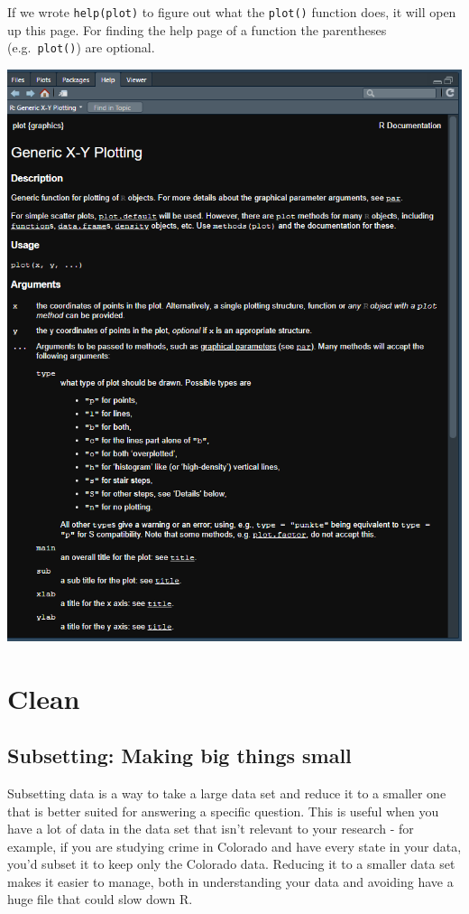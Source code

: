 \documentclass[
  12pt,
  openany]{book}
\begin{document}
If we wrote \texttt{help(plot)} to figure out what the \texttt{plot()} function does, it will open up this page. For finding the help page of a function the parentheses (e.g.~\texttt{plot()}) are optional.

\includegraphics{images/help_page.PNG}

\hypertarget{part-clean}{%
\part{Clean}\label{part-clean}}

\hypertarget{subsetting-intro}{%
\chapter{Subsetting: Making big things small}\label{subsetting-intro}}

Subsetting data is a way to take a large data set and reduce it to a smaller one that is better suited for answering a specific question. This is useful when you have a lot of data in the data set that isn't relevant to your research - for example, if you are studying crime in Colorado and have every state in your data, you'd subset it to keep only the Colorado data. Reducing it to a smaller data set makes it easier to manage, both in understanding your data and avoiding have a huge file that could slow down R.
\end{document}
